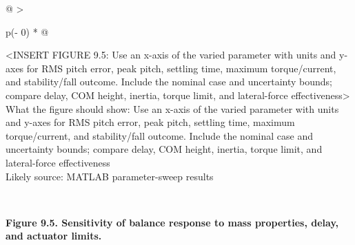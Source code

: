 \begin{longtable}[]{@{}
  >{\raggedright\arraybackslash}p{(\columnwidth - 0\tabcolsep) * }@{}}
\toprule\noalign{}
\begin{minipage}[b]{\linewidth}\raggedright
\textless INSERT FIGURE 9.5: Use an x-axis of the varied parameter with
units and y-axes for RMS pitch error, peak pitch, settling time, maximum
torque\slash{}current, and stability\slash{}fall outcome. Include the nominal case and
uncertainty bounds; compare delay, COM height, inertia, torque limit,
and lateral-force effectiveness\textgreater{}\\
What the figure should show: Use an x-axis of the varied parameter with
units and y-axes for RMS pitch error, peak pitch, settling time, maximum
torque\slash{}current, and stability\slash{}fall outcome. Include the nominal case and
uncertainty bounds; compare delay, COM height, inertia, torque limit,
and lateral-force effectiveness\\
Likely source: MATLAB parameter-sweep results\strut
\end{minipage} \\
\midrule\noalign{}
\endhead
\bottomrule\noalign{}
\endlastfoot
\end{longtable}

\begin{center}\singlespacing
{}
\textbf{Figure 9.5. Sensitivity of balance response to mass properties, delay, and actuator limits.}
\end{center}

